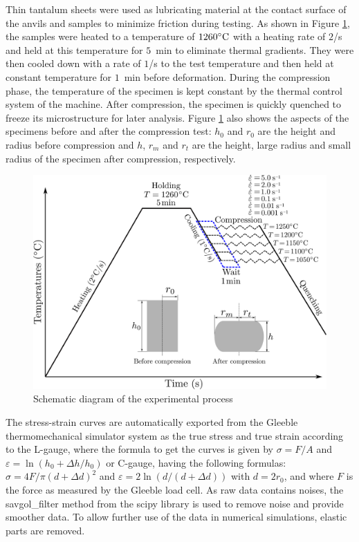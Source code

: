 \documentclass[metals,article,submit,pdftex,moreauthors]{Definitions/mdpi}
\begin{document}
Thin tantalum sheets were used as lubricating material at the contact surface of the anvils and samples to minimize friction during testing.
As shown in Figure \ref{fig:GleebleProcess}, the samples were heated to a temperature of $1260\celsius$ with a heating rate of $2$\celsius/s and held at this temperature for $5$~min to eliminate thermal gradients.
They were then cooled down with a rate of $1$\celsius/s to the test temperature and then held at constant temperature for $1$~min before deformation.
During the compression phase, the temperature of the specimen is kept constant by the thermal control system of the machine.
After compression, the specimen is quickly quenched to freeze its microstructure for later analysis.
Figure \ref{fig:GleebleProcess} also shows the aspects of the specimens before and after the compression test: $h_0$ and $r_0$ are the height and radius before compression and $h$, $r_m$ and $r_t$ are the height, large radius and small radius of the specimen after compression, respectively.
\begin{figure}[!ht]
\centering
\includegraphics[width=0.8\columnwidth]{Figures/GleebleProcess}
\caption{Schematic diagram of the experimental process}
\label{fig:GleebleProcess}
\end{figure}

The stress-strain curves are automatically exported from the Gleeble thermomechanical simulator system as the true stress and true strain according to the L-gauge, where the formula to get the curves is given by $\sigma=F/A$ and $\varepsilon=\ln\left(h_0+\Delta h / h_0\right)$ or C-gauge, having the following formulas: $\sigma = 4F/\pi(d+\Delta d)^2$ and $\varepsilon = 2\ln\left(d/(d+\Delta d)\right)$ with $d = 2r_0$, and where $F$ is the force as measured by the Gleeble load cell.
As raw data contains noises, the savgol\_filter method from the scipy library is used to remove noise and provide smoother data.
To allow further use of the data in numerical simulations, elastic parts are removed.
\end{document}
